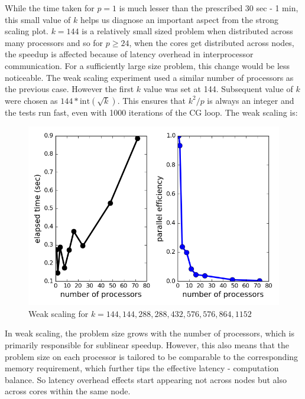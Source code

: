 \documentclass[12pt,letterpaper]{article}
\begin{document}
\noindent While the time taken for $p = 1$ is much lesser than the prescribed 30 sec - 1 min, this small value of $k$ helps us diagnose an important aspect from the strong scaling plot. $k = 144$ is a relatively small sized problem when distributed across many processors and so for $p \geq 24$, when the cores get distributed across nodes, the speedup is affected because of latency overhead in interprocessor communication. For a sufficiently large size problem, this change would be less noticeable.
\newpage
\noindent The weak scaling experiment used a similar number of processors as the previous case. However the first $k$ value was set at 144. Subsequent value of $k$ were chosen as $144 * \mathrm{int}(\sqrt{k})$. This ensures that $k^2/p$ is always an integer and the tests run fast, even with 1000 iterations of the CG loop. The weak scaling is:
%
\begin{figure}[h]
\centering
\includegraphics[scale = 0.7]{weakscale.png}
\caption{Weak scaling for $ k = 144, 144, 288, 288, 432, 576, 576, 864, 1152$}
\end{figure}

\noindent In weak scaling, the problem size grows with the number of processors, which is primarily responsible for sublinear speedup. However, this also means that the problem size on each processor is tailored to be comparable to the corresponding memory requirement, which further tips the effective latency - computation balance. So latency overhead effects start appearing not across nodes but also across cores within the same node.
\end{document}
